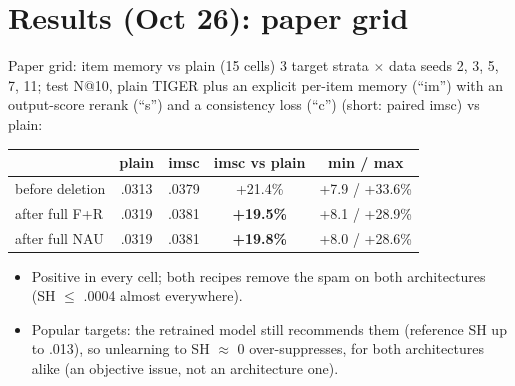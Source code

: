 \documentclass{beamer}
\begin{document}
\section{Results (Oct 26): paper grid}

\begin{frame}{Paper grid: item memory vs plain (15 cells)}
3 target strata $\times$ data seeds 2, 3, 5, 7, 11; test N@10, plain TIGER plus an explicit per-item memory (``im'') with an output-score rerank (``s'') and a consistency loss (``c'') (short: paired imsc) vs plain:
\begin{center}
\footnotesize\setlength{\tabcolsep}{4pt}
\begin{tabular}{|l|c|c|c|c|}
\hline
 & plain & imsc & imsc vs plain & min / max \\
\hline
before deletion   & .0313 & .0379 & +21.4\% & +7.9 / +33.6\% \\
after full F+R    & .0319 & .0381 & \textbf{+19.5\%} & +8.1 / +28.9\% \\
after full NAU    & .0319 & .0381 & \textbf{+19.8\%} & +8.0 / +28.6\% \\
\hline
\end{tabular}
\end{center}
\begin{itemize}
  \item Positive in every cell; both recipes remove the spam on both
        architectures (SH $\leq$ .0004 almost everywhere).
  \item Popular targets: the retrained model still recommends them (reference SH
        up to .013), so unlearning to SH $\approx$ 0 over-suppresses, for both
        architectures alike (an objective issue, not an architecture one).
\end{itemize}
\end{frame}
\end{document}
